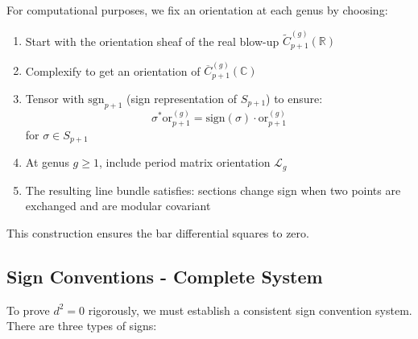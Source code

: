 \begin{remark}
For computational purposes, we fix an orientation at each genus by choosing:
\begin{enumerate}
\item Start with the orientation sheaf of the real blow-up $\widetilde{C}_{p+1}^{(g)}(\mathbb{R})$
\item Complexify to get an orientation of $\overline{C}_{p+1}^{(g)}(\mathbb{C})$ 
\item Tensor with $\text{sgn}_{p+1}$ (sign representation of $S_{p+1}$) to ensure:
   $$\sigma^* \text{or}_{p+1}^{(g)} = \text{sign}(\sigma) \cdot \text{or}_{p+1}^{(g)}$$
   for $\sigma \in S_{p+1}$
\item At genus $g \geq 1$, include period matrix orientation $\mathcal{L}_g$
\item The resulting line bundle satisfies: sections change sign when two points are exchanged and are modular covariant
\end{enumerate}
This construction ensures the bar differential squares to zero.
\end{remark}

\subsection{Sign Conventions - Complete System}

To prove $d^2 = 0$ rigorously, we must establish a consistent sign convention system. There are three types of signs:

